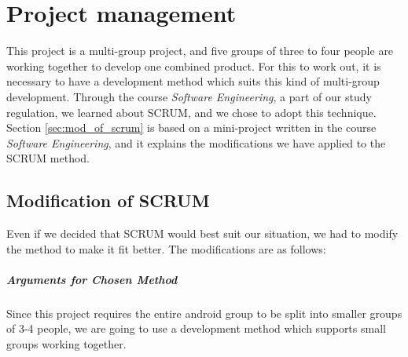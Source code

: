 \chapter{Project management}
This project is a multi-group project, and five groups of three to four people are working together to develop one combined product. For this to work out, it is necessary to have a development method which suits this kind of multi-group development. Through the course \textit{Software Engineering}, a part of our study regulation, we learned about SCRUM, and we chose to adopt this technique.\\
Section \ref{sec:mod_of_scrum} is based on a mini-project written in the course \textit{Software Engineering}, and it explains the modifications we have applied to the SCRUM method.

\section{Modification of SCRUM}
Even if we decided that SCRUM would best suit our situation, we had to modify the method to make it fit better. The modifications are as follows:

\paragraph{Arguments for Chosen Method}
Since this project requires the entire android group to be split into smaller groups of 3-4 people, we are going to use a development method which supports small groups working together.

